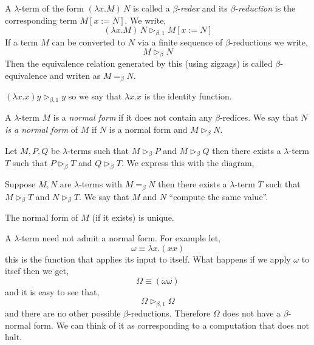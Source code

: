 \documentclass[12pt]{article}
\newcommand{\red}{\triangleright}
\newcommand{\bredo}{\red_{\beta,1}}
\newcommand{\bred}{\red_{\beta}}
\begin{document}
\begin{defn}
A $\lambda$-term of the form $(\lambda x.M) \, N$ is called a $\beta$-\textit{redex} and its $\beta$-\textit{reduction} is the corresponding term $M [x := N]$. We write,
\[ (\lambda x.M) \, N \bredo M [x := N] \]
If a term $M$ can be converted to $N$ via a finite sequence of $\beta$-reductions we write,
\[ M \bred N \]
Then the equivalence relation generated by this (using zigzags) is called $\beta$-equivalence and writen as $M =_\beta N$. 
\end{defn}

\begin{example}
$( \lambda x . x) y \bredo y$ so we say that $\lambda x . x$ is the identity function.
\end{example}

\begin{defn}
A $\lambda$-term $M$ is a \textit{normal form} if it does not contain any $\beta$-redices. We say that $N$ \textit{is a normal form} of $M$ if $N$ is a normal form and $M \bred N$.
\end{defn} 

\begin{theorem}
Let $M, P, Q$ be $\lambda$-terms such that $M \bred P$ and $M \bred Q$ then there exists a $\lambda$-term $T$ such that $P \bred T$ and $Q \bred T$. We express this with the diagram,
\begin{center}
\end{center}
\end{theorem} 

\begin{cor}
Suppose $M, N$ are $\lambda$-terms with $M =_\beta N$ then there exists a $\lambda$-term $T$ such that $M \bred T$ and $N \bred T$. We say that $M$ and $N$ ``compute the same value''.
\end{cor}

\begin{cor}
The normal form of $M$ (if it exists) is unique.
\end{cor}

\begin{example}
A $\lambda$-term need not admit a normal form. For example let,
\[ \omega \equiv \lambda x . (x x) \]
this is the function that applies its input to itself. What happens if we apply $\omega$ to itsef then we get,
\[ \Omega \equiv (\omega \omega) \]
and it is easy to see that,
\[ \Omega \bredo \Omega \]
and there are no other possible $\beta$-reductions. Therefore $\Omega$ does not have a $\beta$-normal form. We can think of it as corresponding to a computation that does not halt.
\end{example}
\end{document}
